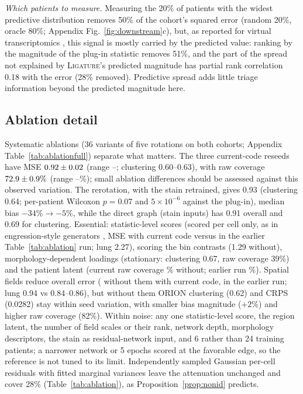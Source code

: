 \documentclass[10pt,letterpaper]{article}
\theoremstyle{definition}
\theoremstyle{remark}
\newcommand{\method}{\textnormal{\textsc{Ligature}}}
\begin{document}
\emph{Which patients to measure.} Measuring the 20\% of patients with the widest predictive distribution removes 50\% of the cohort's squared error (random 20\%, oracle 80\%; Appendix Fig.~\ref{fig:downstream}c), but, as reported for virtual transcriptomics \citep{batique2026}, this signal is mostly carried by the predicted value: ranking by the magnitude of the plug-in statistic removes 51\%, and the part of the spread not explained by \method{}'s predicted magnitude has partial rank correlation 0.18 with the error (28\% removed). Predictive spread adds little triage information beyond the predicted magnitude here.


\subsection{Ablation detail}
Systematic ablations (36 variants of five rotations on both cohorts; Appendix Table~\ref{tab:ablationfull}) separate what matters. The three current-code reseeds have MSE $0.92\pm0.02$ (range \SeedMSEMin--\SeedMSEMax; clustering 0.60--0.63), with raw coverage $72.9\pm0.9\%$ (range \SeedCoverageMin--\SeedCoverageMax\%); small ablation differences should be assessed against this observed variation. The rerotation, with the stain retrained, gives 0.93 (clustering 0.64; per-patient Wilcoxon $p=0.07$ and $5\times10^{-6}$ against the plug-in), median bias $-34\%\to-5\%$, while the direct graph (stain inputs) has 0.91 overall and 0.69 for clustering. Essential: statistic-level scores (scored per cell only, as in engression-style generators \citep{engression2024}, MSE \CurrentCellOnlyMSE{} with current code versus \OldCellOnlyMSE{} in the earlier Table~\ref{tab:ablation} run; lung 2.27), scoring the bin contrasts (1.29 without), morphology-dependent loadings (stationary: clustering 0.67, raw coverage 39\%) and the patient latent (current raw coverage \CurrentNoPatientCoverage\% without; earlier run \NoPatientCoverage\%). Spatial fields reduce overall error (\CurrentNoFieldsMSE{} without them with current code, \OldNoFieldsMSE{} in the earlier run; lung 0.94 vs 0.84--0.86), but without them ORION clustering (0.62) and CRPS (0.0282) stay within seed variation, with smaller bias magnitude ($+2\%$) and higher raw coverage (82\%). Within noise: any one statistic-level score, the region latent, the number of field scales or their rank, network depth, morphology descriptors, the stain as residual-network input, and 6 rather than 24 training patients; a narrower network or 5 epochs scored at the favorable edge, so the reference is not tuned to its limit. Independently sampled Gaussian per-cell residuals with fitted marginal variances leave the attenuation unchanged and cover 28\% (Table~\ref{tab:ablation}), as Proposition~\ref{prop:nonid} predicts.
\end{document}
